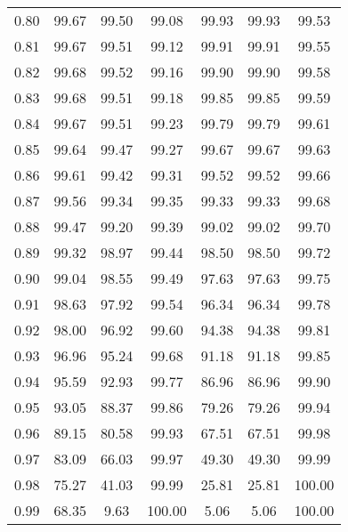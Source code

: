 \begin{tabular}{|c|c|c|c|c|c|c|}
      0.80 &     99.67 &     99.50 &      99.08 &   99.93 &      99.93 &         99.53 \\
      0.81 &     99.67 &     99.51 &      99.12 &   99.91 &      99.91 &         99.55 \\
      0.82 &     99.68 &     99.52 &      99.16 &   99.90 &      99.90 &         99.58 \\
      0.83 &     99.68 &     99.51 &      99.18 &   99.85 &      99.85 &         99.59 \\
      0.84 &     99.67 &     99.51 &      99.23 &   99.79 &      99.79 &         99.61 \\
      0.85 &     99.64 &     99.47 &      99.27 &   99.67 &      99.67 &         99.63 \\
      0.86 &     99.61 &     99.42 &      99.31 &   99.52 &      99.52 &         99.66 \\
      0.87 &     99.56 &     99.34 &      99.35 &   99.33 &      99.33 &         99.68 \\
      0.88 &     99.47 &     99.20 &      99.39 &   99.02 &      99.02 &         99.70 \\
      0.89 &     99.32 &     98.97 &      99.44 &   98.50 &      98.50 &         99.72 \\
      0.90 &     99.04 &     98.55 &      99.49 &   97.63 &      97.63 &         99.75 \\
      0.91 &     98.63 &     97.92 &      99.54 &   96.34 &      96.34 &         99.78 \\
      0.92 &     98.00 &     96.92 &      99.60 &   94.38 &      94.38 &         99.81 \\
      0.93 &     96.96 &     95.24 &      99.68 &   91.18 &      91.18 &         99.85 \\
      0.94 &     95.59 &     92.93 &      99.77 &   86.96 &      86.96 &         99.90 \\
      0.95 &     93.05 &     88.37 &      99.86 &   79.26 &      79.26 &         99.94 \\
      0.96 &     89.15 &     80.58 &      99.93 &   67.51 &      67.51 &         99.98 \\
      0.97 &     83.09 &     66.03 &      99.97 &   49.30 &      49.30 &         99.99 \\
      0.98 &     75.27 &     41.03 &      99.99 &   25.81 &      25.81 &        100.00 \\
      0.99 &     68.35 &      9.63 &     100.00 &    5.06 &       5.06 &        100.00 \\
\bottomrule
\end{tabular}
